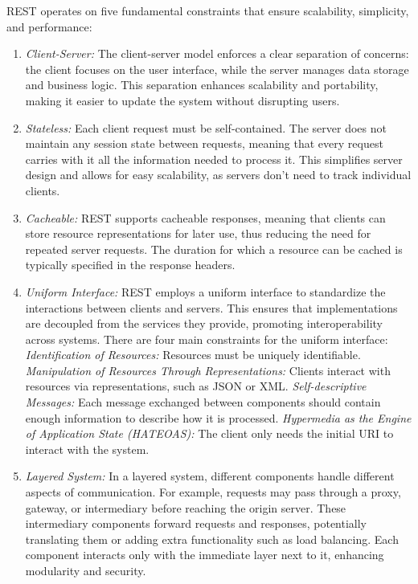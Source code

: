 REST operates on five fundamental constraints that ensure scalability, simplicity, and performance:
\begin{enumerate}
    \item \textit{Client-Server:} The client-server model enforces a clear separation of concerns: the client focuses on the user interface, while the server manages data storage and business logic. This separation enhances scalability and portability, making it easier to update the system without disrupting users.
    \item \textit{Stateless:} Each client request must be self-contained. The server does not maintain any session state between requests, meaning that every request carries with it all the information needed to process it. This simplifies server design and allows for easy scalability, as servers don't need to track individual clients.
    \item \textit{Cacheable:} REST supports cacheable responses, meaning that clients can store resource representations for later use, thus reducing the need for repeated server requests. The duration for which a resource can be cached is typically specified in the response headers.
    \item \textit{Uniform Interface:} REST employs a uniform interface to standardize the interactions between clients and servers. This ensures that implementations are decoupled from the services they provide, promoting interoperability across systems. There are four main constraints for the uniform interface: \textit{Identification of Resources:} Resources must be uniquely identifiable. \textit{Manipulation of Resources Through Representations:} Clients interact with resources via representations, such as JSON or XML. \textit{Self-descriptive Messages:} Each message exchanged between components should contain enough information to describe how it is processed. \textit{Hypermedia as the Engine of Application State (HATEOAS):} The client only needs the initial URI to interact with the system.
    \item \textit{Layered System:} In a layered system, different components handle different aspects of communication. For example, requests may pass through a proxy, gateway, or intermediary before reaching the origin server. These intermediary components forward requests and responses, potentially translating them or adding extra functionality such as load balancing. Each component interacts only with the immediate layer next to it, enhancing modularity and security.
\end{enumerate}

